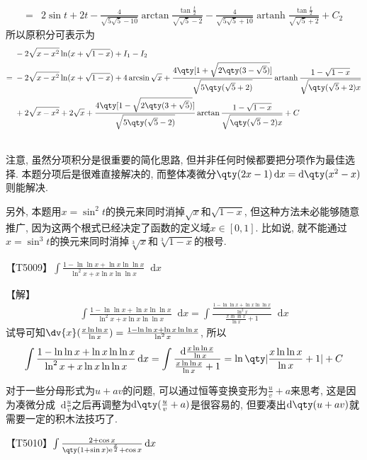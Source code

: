 \documentclass{ctexbook}
\DeclareMathOperator{\artanh}{artanh}
\newcommand{\e}{\mathrm{e}}
\newcommand*{\dif}{\mathop{}\!\mathrm{d}}
\begin{document}
{\begin{align*}
={}&2\sin{t}+2t-\frac{4}{\sqrt{5\sqrt{5}-10}}\arctan{\frac{\tan{\frac{t}{2}}}{\sqrt{\sqrt{5}-2}}}-\frac{4}{\sqrt{5\sqrt{5}+10}}\artanh{\frac{\tan{\frac{t}{2}}}{\sqrt{\sqrt{5}+2}}}+C_{2}
\end{align*}
所以原积分可表示为
\begin{align*}
{}&-2\sqrt{x-x^{2}}\ln(x+\sqrt{1-x})+I_{1}-I_{2}\\
={}&-2\sqrt{x-x^{2}}\ln(x+\sqrt{1-x})+4\arcsin{\sqrt{x}}+\frac{4\qty[1+\sqrt{2\qty(3-\sqrt{5})}]}{\sqrt{5\qty(\sqrt{5}+2)}}\artanh{\frac{1-\sqrt{1-x}}{\sqrt{\qty(\sqrt{5}+2)x}}}\\
{}&+2\sqrt{x-x^{2}}+2\sqrt{x}+\frac{4\qty[1-\sqrt{2\qty(3+\sqrt{5})}]}{\sqrt{5\qty(\sqrt{5}-2)}}\arctan{\frac{1-\sqrt{1-x}}{\sqrt{\qty(\sqrt{5}-2)x}}}+C\\
{}&
\end{align*}\par
{\kaishu 注意, 虽然分项积分是很重要的简化思路, 但并非任何时候都要把分项作为最佳选择. 本题分项后是很难直接解决的, 而整体凑微分$\qty(2x-1)\dif{x}=\dif{\qty(x^{2}-x)}$则能解决. \par
另外, 本题用$x=\sin^{2}{t}$的换元来同时消掉$\sqrt{x}$和$\sqrt{1-x}$, 但这种方法未必能够随意推广, 因为这两个根式已经决定了函数的定义域$x\in\left[0,1\right]$. 比如说, 就不能通过$x=\sin^{3}{t}$的换元来同时消掉$\sqrt[3]{x}$和$\sqrt[3]{1-x}$的根号. \par}
【T5009】$\int\frac{1-\ln{\ln{x}}+\ln{x}\ln{\ln{x}}}{\ln^{2}{x}+x\ln{x}\ln{\ln{x}}}\dif{x}$\par
【解】
\begin{align*}
\int\frac{1-\ln{\ln{x}}+\ln{x}\ln{\ln{x}}}{\ln^{2}{x}+x\ln{x}\ln{\ln{x}}}\dif{x}=\int\frac{\frac{1-\ln{\ln{x}}+\ln{x}\ln{\ln{x}}}{\ln^{2}{x}}}{\frac{x\ln{\ln{x}}}{\ln{x}}+1}\dif{x}
\end{align*}
试导可知$\dv{x}(\frac{x\ln{\ln{x}}}{\ln{x}})=\frac{1-\ln{\ln{x}}+\ln{x}\ln{\ln{x}}}{\ln^{2}{x}}$, 所以
\begin{align*}
\int\frac{1-\ln{\ln{x}}+\ln{x}\ln{\ln{x}}}{\ln^{2}{x}+x\ln{x}\ln{\ln{x}}}\dif{x}=\int\frac{\dif{\frac{x\ln{\ln{x}}}{\ln{x}}}}{\frac{x\ln{\ln{x}}}{\ln{x}}+1}=\ln\qty|\frac{x\ln{\ln{x}}}{\ln{x}}+1|+C
\end{align*}\par
{\kaishu 对于一些分母形式为$u+av$的问题, 可以通过恒等变换变形为$\frac{u}{v}+a$来思考, 这是因为凑微分成$\dif{\frac{u}{v}}$之后再调整为$\dif{\qty(\frac{u}{v}+a)}$是很容易的, 但要凑出$\dif{\qty(u+av)}$就需要一定的积木法技巧了. \par}
【T5010】$\int\frac{2+\cos{x}}{\qty(1+\sin{x})\e^{\frac{x}{2}}+\cos{x}}\dif{x}$\par
}
\end{document}
